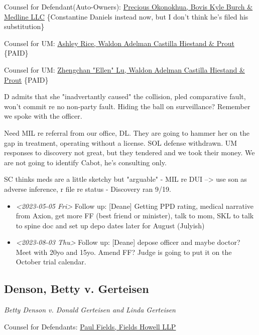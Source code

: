 \documentclass[11pt]{article}
\begin{document}
Counsel for Defendant(Auto-Owners): \href{https://gabar.reliaguide.com/lawyer/30338-GA-Precious-Okonokhua-387461}{Precious Okonokhua, Bovis Kyle Burch \& Medline LLC} \{Constantine Daniels instead now, but I don't think he's filed his substitution\}

Counsel for UM: \href{https://gabar.reliaguide.com/lawyer/30339-GA-Ashley-Rice-268185}{Ashley Rice, Waldon Adelman Castilla Hiestand \& Prout} \{PAID\}

Counsel for UM: \href{https://gabar.reliaguide.com/lawyer/30604-GA-Ellen-Lundergan-325742}{Zhengchan "Ellen" Lu, Waldon Adelman Castilla Hiestand \& Prout} \{PAID\}

D admits that she "inadvertantly caused" the collision, pled comparative fault, won't commit re no non-party fault. Hiding the ball on surveillance? Remember we spoke with the officer. 

Need MIL re referral from our office, DL. They are going to hammer her on the gap in treatment, operating without a license. SOL defense withdrawn. UM responses to discovery not great, but they tendered and we took their money. We are not going to identify Cabot, he's consulting only.

SC thinks meds are a little sketchy but "arguable" - MIL re DUI --> use son as adverse inference, r file re status - Discovery ran 9/19.

\begin{itemize}
\item \textit{<2023-05-05 Fri> } Follow up: [Deane] Getting PPD rating, medical narrative from Axion, get more FF (best friend or minister), talk to mom, SKL to talk to spine doc and set up depo dates later for August (Julyish)

\item \textit{<2023-08-03 Thu> } Follow up: [Deane] depose officer and maybe doctor? Meet with 20yo and 15yo. Amend FF? Judge is going to put it on the October trial calendar.
\end{itemize}

\subsection*{Denson, Betty v. Gerteisen}
\label{sec:org6bea69a}

\emph{Betty Denson v. Donald Gerteisen and Linda Gerteisen}

Counsel for Defendants: \href{https://gabar.reliaguide.com/lawyer/30309-GA-Paul-Fields-256388}{Paul Fields, Fields Howell LLP}
\end{document}
